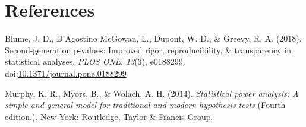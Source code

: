 \documentclass[man]{apa6}
\begin{document}
\newpage

\section{References}\label{references}

\begingroup
\setlength{\parindent}{-0.5in} \setlength{\leftskip}{0.5in}

\hypertarget{refs}{}
\hypertarget{ref-blume_second-generation_2018}{}
Blume, J. D., D'Agostino McGowan, L., Dupont, W. D., \& Greevy, R. A.
(2018). Second-generation p-values: Improved rigor, reproducibility, \&
transparency in statistical analyses. \emph{PLOS ONE}, \emph{13}(3),
e0188299.
doi:\href{https://doi.org/10.1371/journal.pone.0188299}{10.1371/journal.pone.0188299}

\hypertarget{ref-murphy_statistical_2014}{}
Murphy, K. R., Myors, B., \& Wolach, A. H. (2014). \emph{Statistical
power analysis: A simple and general model for traditional and modern
hypothesis tests} (Fourth edition.). New York: Routledge, Taylor \&
Francis Group.

\endgroup
\end{document}
